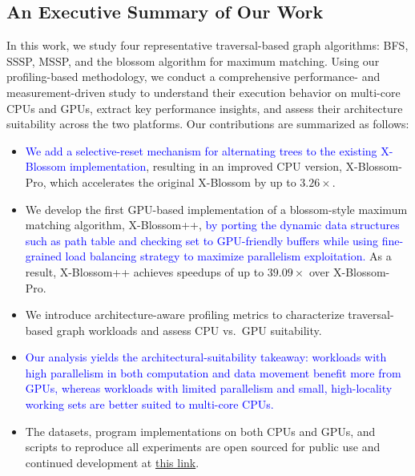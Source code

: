 \subsection{An Executive Summary of Our Work}\label{subsec:intro-exec-summary}
In this work, we study four representative traversal-based graph algorithms: BFS, SSSP, MSSP, and the blossom algorithm for maximum matching.
Using our profiling-based methodology, we conduct a comprehensive performance- and measurement-driven study to understand their execution behavior on multi-core CPUs and GPUs, extract key performance insights, and assess their architecture suitability across the two platforms.
Our contributions are summarized as follows:
\begin{itemize}[leftmargin=*, topsep=0pt, itemsep=0pt, parsep=0pt]
  \item 
  \textcolor{blue}{We add a selective-reset mechanism for alternating trees to the existing X-Blossom implementation}, resulting in an improved CPU version, X-Blossom-Pro, which accelerates the original X-Blossom by up to $3.26\times$.
  \item 
  We develop the first GPU-based implementation of a blossom-style maximum matching algorithm, X-Blossom++, \textcolor{blue}{by porting the dynamic data structures such as path table and checking set to GPU-friendly buffers while using fine-grained load balancing strategy to maximize parallelism exploitation. }
  As a result, X-Blossom++ achieves speedups of up to $39.09\times$ over X-Blossom-Pro.
  \item We introduce architecture-aware profiling metrics to characterize traversal-based graph workloads and assess CPU vs.~GPU suitability.
  \item {}\label{item:takeaway-architecture-suitability}\textcolor{blue}{Our analysis yields the architectural-suitability takeaway: workloads with high parallelism in both computation and data movement benefit more from GPUs, whereas workloads with limited parallelism and small, high-locality working sets are better suited to multi-core CPUs.}
  \item The datasets, program implementations on both CPUs and GPUs, and scripts to reproduce all experiments are open sourced for public use and continued development at \href{https://github.com/victorliu-sq/GACGE-SIGMETRICS27}{this link}.
\end{itemize}

